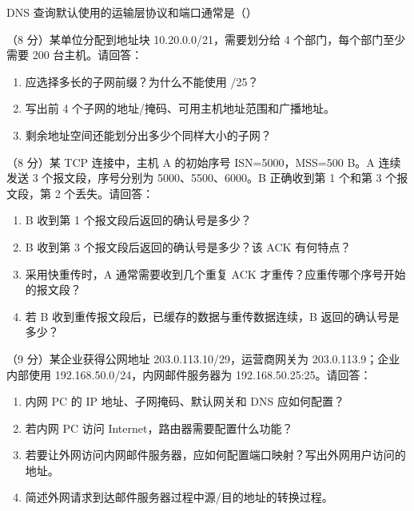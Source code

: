 \documentclass[a4paper,11pt]{article}
\begin{document}
\q DNS 查询默认使用的运输层协议和端口通常是（\quad）


\q （8 分）某单位分配到地址块 10.20.0.0/21，需要划分给 4 个部门，每个部门至少需要 200 台主机。请回答：
\begin{enumerate}[label=（\arabic*）, leftmargin=2.4em, itemsep=1pt]
  \item 应选择多长的子网前缀？为什么不能使用 /25？
  \item 写出前 4 个子网的地址/掩码、可用主机地址范围和广播地址。
  \item 剩余地址空间还能划分出多少个同样大小的子网？
\end{enumerate}
\anslines{8cm}

\q （8 分）某 TCP 连接中，主机 A 的初始序号 ISN=5000，MSS=500 B。A 连续发送 3 个报文段，序号分别为 5000、5500、6000。B 正确收到第 1 个和第 3 个报文段，第 2 个丢失。请回答：
\begin{enumerate}[label=（\arabic*）, leftmargin=2.4em, itemsep=1pt]
  \item B 收到第 1 个报文段后返回的确认号是多少？
  \item B 收到第 3 个报文段后返回的确认号是多少？该 ACK 有何特点？
  \item 采用快重传时，A 通常需要收到几个重复 ACK 才重传？应重传哪个序号开始的报文段？
  \item 若 B 收到重传报文段后，已缓存的数据与重传数据连续，B 返回的确认号是多少？
\end{enumerate}
\anslines{7.5cm}

\q （9 分）某企业获得公网地址 203.0.113.10/29，运营商网关为 203.0.113.9；企业内部使用 192.168.50.0/24，内网邮件服务器为 192.168.50.25:25。请回答：
\begin{enumerate}[label=（\arabic*）, leftmargin=2.4em, itemsep=1pt]
  \item 内网 PC 的 IP 地址、子网掩码、默认网关和 DNS 应如何配置？
  \item 若内网 PC 访问 Internet，路由器需要配置什么功能？
  \item 若要让外网访问内网邮件服务器，应如何配置端口映射？写出外网用户访问的地址。
  \item 简述外网请求到达邮件服务器过程中源/目的地址的转换过程。
\end{enumerate}
\anslines{8cm}
\end{document}

